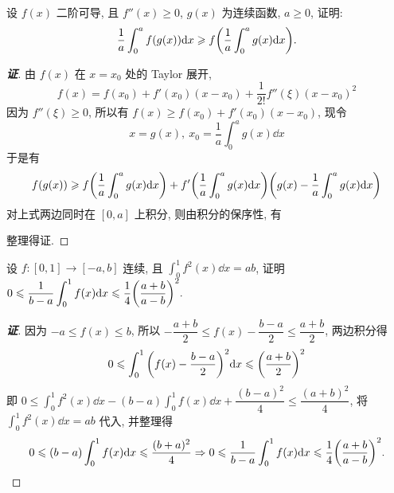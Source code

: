 \begin{example}
    设 $f(x)$ 二阶可导, 且 $f''(x)\geqslant0$, $g(x)$ 为连续函数, $a\geqslant0$, 证明:
    $$\dfrac{1}{a}\int_{0}^{a}f(g(x))\dd x\geqslant f\qty(\dfrac{1}{a}\int_{0}^{a}g(x)\dd x).$$
\end{example}
\begin{proof}[{\songti \textbf{证}}]
    由 $f(x)$ 在 $x=x_0$ 处的 Taylor 展开,
    $$f(x)=f(x_0)+f'(x_0)(x-x_0)+\dfrac{1}{2!}f''(\xi)(x-x_0)^2$$
    因为 $f''(\xi)\geqslant 0$, 所以有 $f(x)\geqslant f(x_0)+f'(x_0)(x-x_0)$, 现令
    $$x=g(x),~x_0=\dfrac{1}{a}\int_{0}^{a}g(x)\dd x$$
    于是有
    $$f(g(x))\geqslant f\qty(\dfrac{1}{a}\int_{0}^{a}g(x)\dd x)+f'\qty(\dfrac{1}{a}\int_{0}^{a}g(x)\dd x)\qty(g(x)-\dfrac{1}{a}\int_{0}^{a}g(x)\dd x)$$
    对上式两边同时在 $[0,a]$ 上积分, 则由积分的保序性, 有
    整理得证.
\end{proof}

\begin{example}
    设 $f:[0,1]\to[-a,b]$ 连续, 且 $\displaystyle\int_{0}^{1}f^2(x)\dd x=ab$, 证明 $\displaystyle0\leqslant \dfrac{1}{b-a}\int_{0}^{1}f(x)\dd x\leqslant \dfrac{1}{4}\qty(\dfrac{a+b}{a-b})^2.$
\end{example}
\begin{proof}[{\songti \textbf{证}}]
    因为 $-a\leqslant f(x)\leqslant b$, 所以 $\displaystyle -\dfrac{a+b}{2}\leqslant f(x)-\dfrac{b-a}{2}\leqslant \dfrac{a+b}{2}$, 两边积分得
    $$0\leqslant \int_{0}^{1}\qty(f(x)-\dfrac{b-a}{2})^2\dd x\leqslant \qty(\dfrac{a+b}{2})^2$$
    即 $\displaystyle 0\leqslant \int_{0}^{1}f^2(x)\dd x-(b-a)\int_{0}^{1}f(x)\dd x+\dfrac{(b-a)^2}{4}\leqslant \dfrac{(a+b)^2}{4}$, 将 $\displaystyle\int_{0}^{1}f^2(x)\dd x=ab$ 代入, 并整理得
    $$0\leqslant (b-a)\int_{0}^{1}f(x)\dd x\leqslant \dfrac{(b+a)^2}{4}\Rightarrow 0\leqslant \dfrac{1}{b-a}\int_{0}^{1}f(x)\dd x\leqslant \dfrac{1}{4}\qty(\dfrac{a+b}{a-b})^2.$$
\end{proof}

